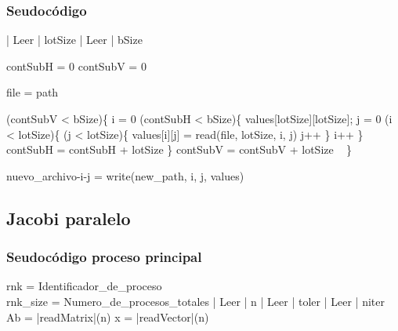 \documentclass{article}
\begin{document}
\subsubsection{Seudocódigo}

\begin{program}
| Leer | lotSize 
| Leer | bSize 

contSubH = 0 
contSubV = 0 

file = path 

\WHILE(contSubV < bSize)\{ 
i = 0 
\WHILE(contSubH < bSize)\{ 
values[lotSize][lotSize]; 
j = 0
\WHILE(i < lotSize)\{
    \WHILE(j < lotSize)\{
        values[i][j] = read(file, lotSize, i, j)
j++
\}
i++
\}
contSubH = contSubH + lotSize 
\}            
contSubV = contSubV + lotSize \ 
\} 
\end{program}



\begin{program}

    nuevo\_archivo-i-j = write(new\_path, i, j, values)

\end{program}

\subsection{Jacobi paralelo}

\subsubsection{Seudocódigo proceso principal}

\begin{program}
    rnk = Identificador\_de\_proceso\\
    rnk\_size = Numero\_de\_procesos\_totales
    | Leer | n 
    | Leer | toler 
    | Leer | niter 
    Ab = |readMatrix|(n) 
    x = |readVector|(n) 
\end{program}
\end{document}

